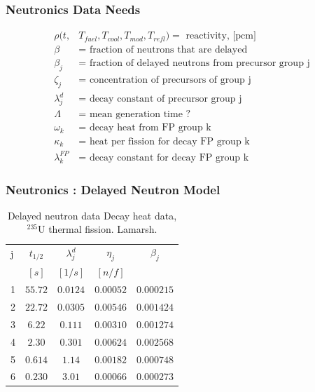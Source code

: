 \begin{frame}[fragile]
  \frametitle{Neutronics Data Needs}
\footnotesize{
  \begin{align}
    \rho(t,&T_{fuel},T_{cool},T_{mod}, T_{refl}) = \mbox{ reactivity, [pcm]}\\
    \beta &= \mbox{ fraction of neutrons that are delayed}\\ 
    \beta_j &= \mbox{ fraction of delayed neutrons from precursor group j}\\  
    \zeta_j &= \mbox{ concentration of precursors of group j}\\ 
    \lambda^{d}_j &= \mbox{ decay constant of precursor group j}\\ 
    \Lambda &= \mbox{ mean generation time ? }\\
    \omega_k &= \mbox{ decay heat from FP group k}\\ 
    \kappa_k &= \mbox{ heat per fission for decay FP group k}\\ 
    \lambda^{FP}_k &= \mbox{ decay constant for decay FP group k} 
  \end{align}
}

\end{frame}
\begin{frame}[fragile]
  \frametitle{Neutronics : Delayed Neutron Model}

    \begin{table}
      \begin{tabular}{|l|c|c|c|c|}
        \hline
        j & $t_{1/2}$ & $\lambda^d_j$  & $\eta_j$ & $\beta_j$\\
          &   $[s]$   &    $[1/s]$     & $[n/f]$  & \\
        \hline
        1   &  $ 55.72 $  &  $ 0.0124 $  &  $ 0.00052 $  &  $ 0.000215$  \\
        2   &  $ 22.72 $  &  $ 0.0305 $  &  $ 0.00546 $  &  $ 0.001424$  \\
        3   &  $ 6.22  $  &  $ 0.111  $  &  $ 0.00310 $  &  $ 0.001274$  \\
        4   &  $ 2.30  $  &  $ 0.301  $  &  $ 0.00624 $  &  $ 0.002568$  \\
        5   &  $ 0.614 $  &  $ 1.14   $  &  $ 0.00182 $  &  $ 0.000748$  \\
        6   &  $ 0.230 $  &  $ 3.01   $  &  $ 0.00066 $  &  $ 0.000273$  \\
        \hline
      \end{tabular}
      \caption{Delayed neutron data Decay heat data, $^{235}$U thermal fission. 
    Lamarsh.}
      \label{tab:delayedneutrons}
    \end{table}

\end{frame}


